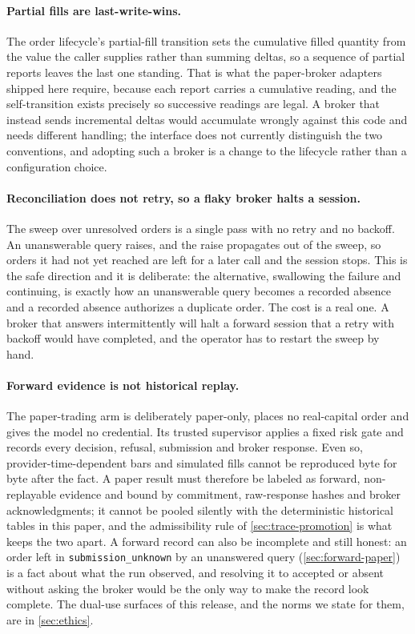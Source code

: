 \paragraph{Partial fills are last-write-wins.} The order lifecycle's partial-fill transition sets the cumulative filled quantity from the value the caller supplies rather than summing deltas, so a sequence of partial reports leaves the last one standing. That is what the paper-broker adapters shipped here require, because each report carries a cumulative reading, and the self-transition exists precisely so successive readings are legal. A broker that instead sends incremental deltas would accumulate wrongly against this code and needs different handling; the interface does not currently distinguish the two conventions, and adopting such a broker is a change to the lifecycle rather than a configuration choice.

\paragraph{Reconciliation does not retry, so a flaky broker halts a session.} The sweep over unresolved orders is a single pass with no retry and no backoff. An unanswerable query raises, and the raise propagates out of the sweep, so orders it had not yet reached are left for a later call and the session stops. This is the safe direction and it is deliberate: the alternative, swallowing the failure and continuing, is exactly how an unanswerable query becomes a recorded absence and a recorded absence authorizes a duplicate order. The cost is a real one. A broker that answers intermittently will halt a forward session that a retry with backoff would have completed, and the operator has to restart the sweep by hand.

\paragraph{Forward evidence is not historical replay.} The paper-trading arm is deliberately paper-only, places no real-capital order and gives the model no credential. Its trusted supervisor applies a fixed risk gate and records every decision, refusal, submission and broker response. Even so, provider-time-dependent bars and simulated fills cannot be reproduced byte for byte after the fact. A paper result must therefore be labeled as forward, non-replayable evidence and bound by commitment, raw-response hashes and broker acknowledgments; it cannot be pooled silently with the deterministic historical tables in this paper, and the admissibility rule of \cref{sec:trace-promotion} is what keeps the two apart. A forward record can also be incomplete and still honest: an order left in \texttt{submission\_unknown} by an unanswered query (\cref{sec:forward-paper}) is a fact about what the run observed, and resolving it to accepted or absent without asking the broker would be the only way to make the record look complete. The dual-use surfaces of this release, and the norms we state for them, are in \cref{sec:ethics}.
